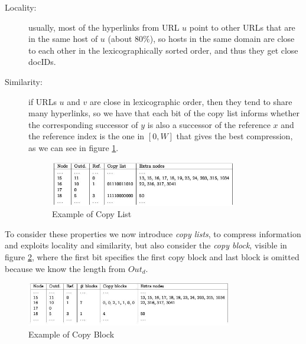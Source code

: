 \begin{description}
	    \item [Locality: ] usually, most of the hyperlinks from URL $u$ point to other URLs that are in the same host of $u$ (about $80\%$), so hosts in the same domain are 
		               close to each other in the lexicographically sorted order, and thus they get close docIDs.

	    \item [Similarity: ] if URLs $u$ and $v$ are close in lexicographic order, then they tend to share many hyperlinks, so we have that each bit of the copy list informs 
		                 whether the corresponding successor of $y$ is also a successor of the reference $x$ and the reference index is the one in $[0, W]$ that gives the best compression,
				 as we can see in figure \ref{img:copyList}.

				 \begin{figure}
					\includegraphics[width=0.8\textwidth]{Images/compressedAdjancency}
					\caption{Example of Copy List}
					\label{img:copyList}
				 \end{figure} 
    \end{description}
    To consider these properties we now introduce \emph{copy lists}, to compress information and exploits locality and similarity, but also consider the \emph{copy block}, 
    visible in figure \ref{img:copyBlock}, where the first bit specifies the first copy block and last block is omitted because we know the length from $Out_d$.

    \begin{figure}
	\includegraphics[width=0.8\textwidth]{Images/copyBlock}
	\caption{Example of Copy Block}
	\label{img:copyBlock}
    \end{figure}

